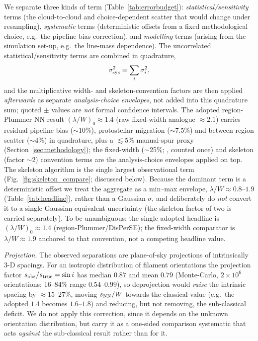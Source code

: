 \documentclass[usenatbib,twoside,twocolumn]{mnras}
\begin{document}
We separate three kinds of term (Table~\ref{tab:errorbudget}): \emph{statistical/sensitivity} terms (the cloud-to-cloud and choice-dependent scatter that would change under resampling), \emph{systematic} terms (deterministic offsets from a fixed methodological choice, e.g.\ the pipeline bias correction), and \emph{modelling} terms (arising from the simulation set-up, e.g.\ the line-mass dependence). The uncorrelated statistical/sensitivity terms are combined in quadrature,
\begin{equation}
\sigma_{\rm sys}^2=\sum_i\sigma_i^2,
\label{eq:quadrature}
\end{equation}
and the multiplicative width- and skeleton-convention factors are then applied \emph{afterwards} as separate \emph{analysis-choice envelopes}, not added into this quadrature sum; quoted $\pm$ values are \emph{not} formal confidence intervals. The adopted region-Plummer NN result $(\lambda/W)_0\approx1.4$ (raw fixed-width analogue $\approx2.1$) carries residual pipeline bias ($\sim$10\%), protostellar migration ($\sim$7.5\%) and between-region scatter ($\sim$4\%) in quadrature, plus a $\lesssim5\%$ manual-spur proxy (Section~\ref{sec:methodology}); the fixed-width ($\sim$25\%; \citealt{Panopoulou2022}, counted once) and skeleton (factor $\sim$2) convention terms are the analysis-choice envelopes applied on top. The skeleton algorithm is the single largest observational term (Fig.~\ref{fig:skeleton_compare}; discussed below). Because the dominant term is a deterministic offset we treat the aggregate as a min--max envelope, $\lambda/W\approx0.8$--$1.9$ (Table~\ref{tab:headline}), rather than a Gaussian $\sigma$, and deliberately do \emph{not} convert it to a single Gaussian-equivalent uncertainty (the skeleton factor of two is carried separately). To be unambiguous: the single adopted headline is $(\lambda/W)_0\approx1.4$ (region-Plummer/DisPerSE); the fixed-width comparator is $\lambda/W\approx1.9$ anchored to that convention, not a competing headline value.

\emph{Projection.} The observed separations are plane-of-sky projections of intrinsically 3-D spacings. For an isotropic distribution of filament orientations the projection factor $s_{\rm obs}/s_{\rm true}=\sin i$ has median $0.87$ and mean $0.79$ (Monte-Carlo, $2\times10^6$ orientations; 16--84\% range $0.54$--$0.99$), so deprojection would \emph{raise} the intrinsic spacing by $\approx15$--$27\%$, moving $s_{\rm NN}/W$ towards the classical value (e.g.\ the adopted $1.4$ becomes $1.6$--$1.8$) and reducing, but not removing, the sub-classical deficit. We do not apply this correction, since it depends on the unknown orientation distribution, but carry it as a one-sided comparison systematic that acts \emph{against} the sub-classical result rather than for it.
\end{document}
